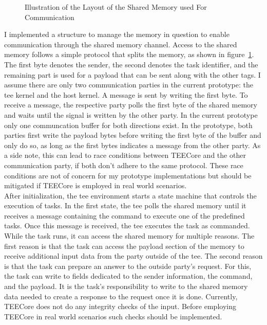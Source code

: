 \begin{center}
  \begin{figure}
    \centering
    
    \caption{Illustration of the Layout of the Shared Memory used For Communication}
    \label{fig:impl:shared_mem_layout}
  \end{figure}
\end{center}

I implemented a structure to manage the memory in question to enable
communication through the shared memory channel. Access to the shared memory
follows a simple protocol that splits the memory, as shown in
figure~\ref{fig:impl:shared_mem_layout}. The first byte denotes the sender, the
second denotes the task identifier, and the remaining part is used for a payload
that can be sent along with the other tags. I assume there are only two
communication parties in the current prototype: the \gls{tee} kernel and the
host kernel. A message is sent by writing the first byte. To receive a message,
the respective party polls the first byte of the shared memory and waits until
the signal is written by the other party. In the current prototype only one
communcation buffer for both directions exist. In the prototype, both parties
first write the payload bytes before writing the first byte of the buffer and
only do so, as long as the first bytes indicates a message from the other party.
As a side note, this can lead to race conditions between TEECore and the other
communication party, if both don't adhere to the same protocol. These race
conditions are not of concern for my prototype implementations but should be
mitigated if TEECore is employed in real world scenarios.\\

After initialization, the \gls{tee} environment starts a state machine that
controls the execution of tasks. In the first state, the \gls{tee} polls the
shared memory until it receives a message containing the command to execute one
of the predefined tasks. Once this message is received, the \gls{tee} executes
the task as commanded. While the task runs, it can access the shared memory for
multiple reasons. The first reason is that the task can access the payload
section of the memory to receive additional input data from the party outside of
the \gls{tee}. The second reason is that the task can prepare an answer to the
outside party's request. For this, the task can write to fields dedicated to the
sender information, the command, and the payload. It is the task's
responsibility to write to the shared memory data needed to create a response to
the request once it is done. Currently, TEECore does not do any integrity checks
of the input. Before employing TEECore in real world scenarios such checks
should be implemented.

